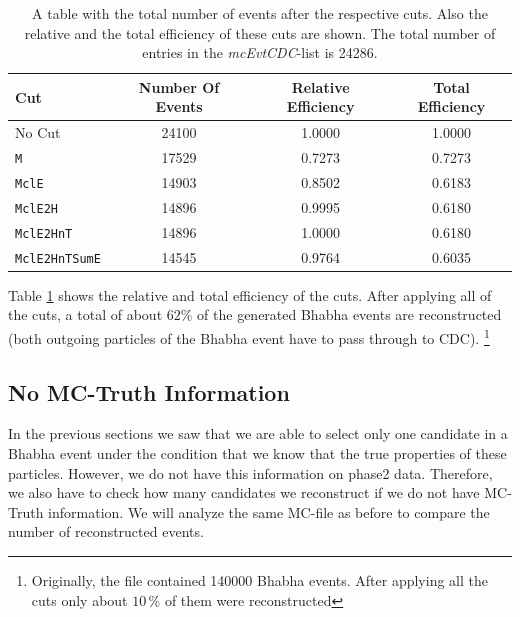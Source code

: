 \documentclass[a4paper,11pt,twosided,final,german,openbib,pdftex,listof=totoc,bibliography=totoc]{scrbook}
\begin{document}
\begin{table}[h!]
	\centering
\begin{tabular}{lccc}
 Cut& Number Of Events&  Relative Efficiency& Total Efficiency\\
 \hline
 No Cut&24100 &1.0000 &1.0000 \\
 \texttt{M}& 17529&0.7273 &0.7273 \\
 \texttt{MclE}&14903 &0.8502 &0.6183 \\
 \texttt{MclE2H}&14896&0.9995  &0.6180 \\
 \texttt{MclE2HnT}&14896 &1.0000 &0.6180 \\
 \texttt{MclE2HnTSumE}& 14545 &0.9764 &0.6035 \\

\end{tabular}

\caption[Cut Efficiencies]{A table with the total number of events after the respective cuts. Also the relative and the total efficiency of these cuts are shown. The total number of entries in the \textit{mcEvtCDC}-list is 24286.}
\label{tab:cutEff}
\end{table}

Table \ref{tab:cutEff} shows the relative and total efficiency of the cuts. After applying all of the cuts, a total of about $62\%$ of the generated Bhabha events are reconstructed (both outgoing particles of the Bhabha event have to pass through to CDC).
\footnote{Originally, the file contained 140000 Bhabha events. After applying all the cuts only about $10\,\%$ of them were reconstructed}

\subsection{No MC-Truth Information}
\label{sec:NoMCT}

In the previous sections we saw that we are able to select only one candidate in a Bhabha event under the condition that we know that the true properties of these particles. However, we do not have this information on phase2 data. Therefore, we also have to check how many candidates we reconstruct if we do not have MC-Truth information. We will analyze the same MC-file as before to compare the number of reconstructed events. 
\end{document}
